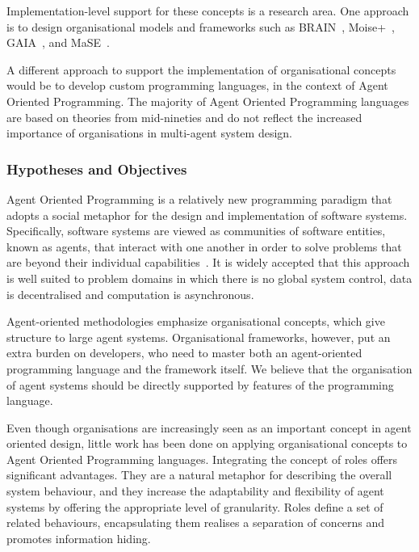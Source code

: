 \documentclass[a4paper,12pt,oneside,fleqn]{book} %
\begin{document}
Implementation-level support for these concepts is a research area. One
approach is to design organisational models and frameworks such as
BRAIN~\cite{DBLP:conf/coopis/CabriLZ03},
Moise+~\cite{DBLP:conf/atal/HubnerSB02},
GAIA~\cite{DBLP:journals/aamas/WooldridgeJK00}, and
MaSE~\cite{deloach2001analysis}.

A different approach to support the implementation of organisational
concepts would be to develop custom programming languages, in the context
of Agent Oriented Programming. The majority of Agent Oriented Programming
languages are based on theories from mid-nineties and do not reflect the
increased importance of organisations in multi-agent system design.

\subsubsection{Hypotheses and Objectives}
Agent Oriented Programming is a relatively new programming paradigm that
adopts a social metaphor for the design and implementation of software
systems.  Specifically, software systems are viewed as communities of
software entities, known as agents, that interact with one another in order
to solve problems that are beyond their individual
capabilities~\cite{DBLP:journals/ai/Shoham93}. It is widely accepted that
this approach is well suited to problem domains in which there is no global
system control, data is decentralised and computation is asynchronous.

Agent-oriented methodologies emphasize organisational concepts, which give
structure to large agent systems. Organisational frameworks, however, put
an extra burden on developers, who need to master both an agent-oriented
programming language and the framework itself. We believe that the
organisation of agent systems should be directly supported by features of
the programming language.

Even though organisations are increasingly seen as an important concept in
agent oriented design, little work has been done on applying organisational
concepts to Agent Oriented Programming languages. Integrating the concept
of roles offers significant advantages. They are a natural metaphor for
describing the overall system behaviour, and they increase the adaptability
and flexibility of agent systems by offering the appropriate level of
granularity. Roles define a set of related behaviours, encapsulating them
realises a separation of concerns and promotes information hiding.
\end{document}

